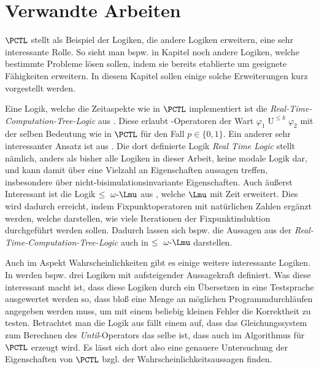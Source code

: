 \section{Verwandte Arbeiten}

$\PCTL$ stellt als Beispiel der Logiken, die andere Logiken erweitern, eine sehr interessante Rolle.
So sieht man bspw. in Kapitel noch andere Logiken, welche bestimmte Probleme lösen sollen, indem sie bereits etablierte um geeignete Fähigkeiten erweitern.
In diesem Kapitel sollen einige solche Erweiterungen kurz vorgestellt werden.

Eine Logik, welche die Zeitaspekte wie in $\PCTL$ implementiert ist die \textit{Real-Time-Computation-Tree-Logic} aus \cite{emerson1991quantitative}. 
Diese erlaubt -Operatoren der Wart $\varphi_1 \operatorname{U}^{\leq k} \varphi_2$ mit der selben Bedeutung wie in $\PCTL$ für den Fall $p\in \{0,1\}$.
Ein anderer sehr interessanter Ansatz ist aus \cite{jahanian1986safety}.
Die dort definierte Logik \textit{Real Time Logic} stellt nämlich, anders als bisher alle Logiken in dieser Arbeit, keine modale Logik dar, und kann damit über eine Vielzahl an Eigenschaften aussagen treffen, insbesondere über nicht-bisimulationsinvariante Eigenschaften.
Auch äußerst Interessant ist die Logik $\leq\text{ }\omega\text{-}\Lmu$ aus \cite{emerson1991real}, welche $\Lmu$ mit Zeit erweitert.
Dies wird dadurch erreicht, indem Fixpunktoperatoren mit natürlichen Zahlen ergänzt werden, welche darstellen, wie viele Iterationen der Fixpunktinduktion durchgeführt werden sollen.
Dadurch lassen sich bspw. die Aussagen aus der \textit{Real-Time-Computation-Tree-Logic} auch in $\leq\text{ }\omega\text{-}\Lmu$ darstellen.

Auch im Aspekt Wahrscheinlichkeiten gibt es einige weitere interessante Logiken. 
In \cite{larsen1989bisimulation} werden bspw. drei Logiken mit aufsteigender Aussagekraft definiert.
Was diese interessant macht ist, dass diese Logiken durch ein Übersetzen in eine \glqq Testsprache\grqq{} ausgewertet werden so, dass bloß eine Menge an möglichen Programmdurchläufen angegeben werden muss, um mit einem beliebig kleinen Fehler die Korrektheit zu testen.
Betrachtet man die Logik aus \cite{courcoubetis1995complexity} fällt einem auf, dass das Gleichungssystem zum Berechnen des \textit{Until}-Operators das selbe ist, dass auch im Algorithmus für $\PCTL$ erzeugt wird.
Es lässt sich dort also eine genauere Untersuchung der Eigenschaften von $\PCTL$ bzgl. der Wahrscheinlichkeitsaussagen finden.

